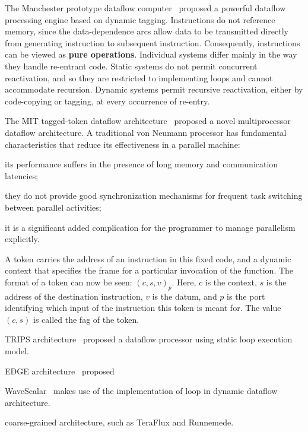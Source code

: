 \documentclass[UTF8]{article}
\begin{document}
The Manchester prototype dataflow computer~\cite{DBLP:journals/cacm/GurdKW85} proposed
a powerful dataflow processing engine based on dynamic tagging.
Instructions do not reference memory, since the data-dependence arcs
allow data to be transmitted directly from generating instruction to subsequent instruction.
Consequently, instructions can be viewed as \textbf{pure operations}.
Individual systems differ mainly in the way they handle re-entrant code.
Static systems do not permit concurrent reactivation,
and so they are restricted to implementing loops and cannot accommodate recursion.
Dynamic systems permit recursive reactivation,
either by code-copying or tagging, at every occurrence of re-entry.

The MIT tagged-token dataflow architecture~\cite{DBLP:journals/tc/ArvindN90} proposed
a novel multiprocessor dataflow architecture.
A traditional von Neumann processor has fundamental characteristics
that reduce its effectiveness in a parallel machine:
\begin{compactitem}
  \item its performance suffers in the presence of long memory and communication latencies;
  \item they do not provide good synchronization mechanisms
        for frequent task switching between parallel activities;
  \item it is a significant added complication for the programmer to manage parallelism explicitly.
\end{compactitem}
A token carries the address of an instruction in this fixed code,
and a dynamic context that specifies the frame for a particular invocation of the function.
The format of a token can now be seen: $(c, s, v)_p$.
Here, $c$ is the context, $s$ is the address of the destination instruction, $v$ is the datum,
and $p$ is the port identifying which input of the instruction this token is meant for.
The value $(c, s)$ is called the fag of the token.

TRIPS architecture~\cite{DBLP:conf/isca/SankaralingamNLKHBKM03} proposed 
a dataflow processor using static loop execution model.

EDGE architecture~\cite{DBLP:journals/computer/BurgerKMDJLMBMY04} proposed

WaveScalar~\cite{DBLP:conf/micro/SwansonMSO03}\cite{DBLP:journals/tocs/SwansonSMPPMOE07}
makes use of the implementation of loop in dynamic dataflow architecture.

coarse-grained architecture, such as TeraFlux and Runnemede.
\end{document}
